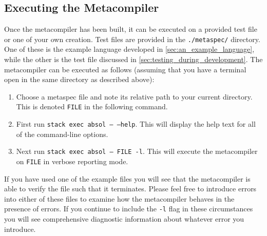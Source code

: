 
\subsection{Executing the Metacompiler} %
\label{sub:executing_the_metacompiler}
Once the metacompiler has been built, it can be executed on a provided test file or one of your own creation.
Test files are provided in the \texttt{./metaspec/} directory. 
One of these is the example language developed in \autoref{sec:an_example_language}, while the other is the test file discussed in \autoref{sec:testing_during_development}.
The metacompiler can be executed as follows (assuming that you have a terminal open in the same directory as described above):
\begin{enumerate}
    \item Choose a metaspec file and note its relative path to your current directory. 
    This is denoted \texttt{FILE} in the following command.
    \item First run \texttt{stack exec absol -- --help}. 
    This will display the help text for all of the command-line options.
    \item Next run \texttt{stack exec absol -- FILE -l}.
    This will execute the metacompiler on \texttt{FILE} in verbose reporting mode. 
\end{enumerate}

If you have used one of the example files you will see that the metacompiler is able to verify the file such that it terminates.
Please feel free to introduce errors into either of these files to examine how the metacompiler behaves in the presence of errors. 
If you continue to include the \texttt{-l} flag in these circumstances you will see comprehensive diagnostic information about whatever error you introduce. 



